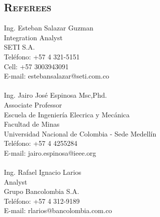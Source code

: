 \begin{resume}
\section{\textsc{Referees}}


 Ing. Esteban Salazar Guzman\\
 Integration Analyst \\
 SETI S.A. \\
 Tel\'{e}fono: +57 4 321-5151 \\
 Cell: +57 3003943091 \\ 
 E-mail: estebansalazar@seti.com.co\\
 \\  
 Ing. Jairo Jos\'{e} Espinosa Msc,Phd.\\
 Associate Professor \\
 Escuela de Ingenier\'{i}a Elecrica y Mec\'{a}nica \\
 Facultad de Minas \\
 Universidad Nacional de Colombia - Sede  Medell\'{i}n\\
 Tel\'{e}fono: +57 4 4255284 \\
 E-mail: jairo.espinosa@ieee.org\\
 \\  
 Ing. Rafael Ignacio Larios\\
 Analyst  \\
 Grupo Bancolombia S.A. \\
 Tel\'{e}fono: +57 4 312-9189  \\
 E-mail: rlarios@bancolombia.com.co \\



\end{resume}
